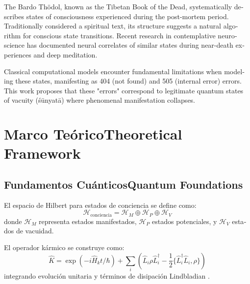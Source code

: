 \documentclass[12pt,a4paper]{article}
\newcommand{\es}[1]{\foreignlanguage{spanish}{#1}}
\newcommand{\en}[1]{\foreignlanguage{english}{#1}}
\begin{document}
\begin{otherlanguage}{english}
The Bardo Thödol, known as the Tibetan Book of the Dead, systematically describes states of consciousness experienced during the post-mortem period. Traditionally considered a spiritual text, its structure suggests a natural algorithm for conscious state transitions. Recent research in contemplative neuroscience has documented neural correlates of similar states during near-death experiences and deep meditation.

Classical computational models encounter fundamental limitations when modeling these states, manifesting as 404 (not found) and 505 (internal error) errors. This work proposes that these "errors" correspond to legitimate quantum states of vacuity (śūnyatā) where phenomenal manifestation collapses.
\end{otherlanguage}

\section{\es{Marco Teórico}\en{Theoretical Framework}}

\subsection{\es{Fundamentos Cuánticos}\en{Quantum Foundations}}

\begin{otherlanguage}{spanish}
El espacio de Hilbert para estados de conciencia se define como:
\begin{equation}
\mathcal{H}_{\text{conciencia}} = \mathcal{H}_M \oplus \mathcal{H}_P \oplus \mathcal{H}_V
\end{equation}
donde $\mathcal{H}_M$ representa estados manifestados, $\mathcal{H}_P$ estados potenciales, y $\mathcal{H}_V$ estados de vacuidad.

El operador kármico se construye como:
\begin{equation}
\hat{K} = \exp\left(-i\hat{H}_k t/\hbar\right) + \sum_i \left(\hat{L}_i \rho \hat{L}_i^\dagger - \frac{1}{2}\{\hat{L}_i^\dagger \hat{L}_i, \rho\}\right)
\end{equation}
integrando evolución unitaria y términos de disipación Lindbladian \cite{hameroff2014, zurek2003}.
\end{otherlanguage}
\end{document}

